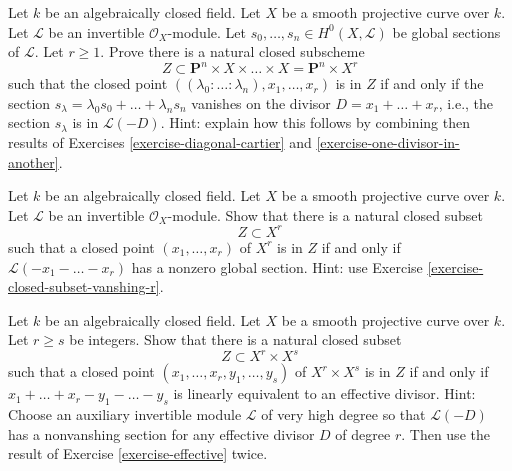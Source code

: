 \begin{exercise}
\label{exercise-closed-subset-vanshing-r}
Let $k$ be an algebraically closed field. Let $X$ be a smooth projective curve
over $k$. Let $\mathcal{L}$ be an invertible $\mathcal{O}_X$-module.
Let $s_0, \ldots, s_n \in H^0(X, \mathcal{L})$
be global sections of $\mathcal{L}$. Let $r \geq 1$.
Prove there is a natural closed subscheme
$$
Z \subset
\mathbf{P}^n \times X \times \ldots \times X = \mathbf{P}^n \times X^r
$$
such that the closed point
$((\lambda_0 : \ldots : \lambda_n), x_1, \ldots, x_r)$
is in $Z$ if and only if the section
$s_\lambda = \lambda_0 s_0 + \ldots + \lambda_n s_n$
vanishes on the divisor $D = x_1 + \ldots + x_r$, i.e.,
the section $s_\lambda$ is in $\mathcal{L}(-D)$.
Hint: explain how this follows by combining then results of
Exercises \ref{exercise-diagonal-cartier} and
\ref{exercise-one-divisor-in-another}.
\end{exercise}

\begin{exercise}
\label{exercise-effective}
Let $k$ be an algebraically closed field. Let $X$ be a smooth projective curve
over $k$. Let $\mathcal{L}$ be an invertible $\mathcal{O}_X$-module.
Show that there is a natural closed subset
$$
Z \subset X^r
$$
such that a closed point $(x_1, \ldots, x_r)$ of $X^r$ is in $Z$
if and only if $\mathcal{L}(-x_1 - \ldots -x_r)$ has a nonzero
global section. Hint: use Exercise \ref{exercise-closed-subset-vanshing-r}.
\end{exercise}

\begin{exercise}
\label{exercise-difference-effective}
Let $k$ be an algebraically closed field. Let $X$ be a smooth projective curve
over $k$. Let $r \geq s$ be integers. Show that there is a natural closed
subset
$$
Z \subset X^r \times X^s
$$
such that a closed point $(x_1, \ldots, x_r, y_1, \ldots, y_s)$ of
$X^r \times X^s$ is in $Z$
if and only if $x_1 + \ldots + x_r - y_1 - \ldots - y_s$
is linearly equivalent to an effective divisor.
Hint: Choose an auxiliary invertible module $\mathcal{L}$
of very high degree so that $\mathcal{L}(-D)$ has a nonvanshing
section for any effective divisor $D$ of degree $r$.
Then use the result of Exercise \ref{exercise-effective} twice.
\end{exercise}

